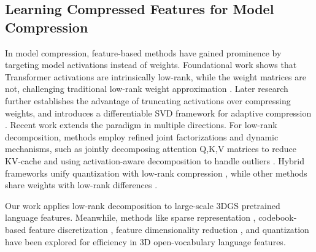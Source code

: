\documentclass[10pt,twocolumn,letterpaper]{article}
\begin{document}
\subsection{Learning Compressed Features for Model Compression}
In model compression, feature-based methods have gained prominence by targeting model activations instead of weights. Foundational work shows that Transformer activations are intrinsically low-rank, while the weight matrices are not, challenging traditional low-rank weight approximation \cite{yu2023compressing}. Later research further establishes the advantage of truncating activations over compressing weights, and introduces a differentiable SVD framework for adaptive compression \cite{wang2025dobi}.
Recent work extends the paradigm in multiple directions. For low-rank decomposition, methods employ refined joint factorizations and dynamic mechanisms, such as jointly decomposing attention Q,K,V matrices to reduce KV-cache \cite{wang2025qsvd} and using activation-aware decomposition to handle outliers \cite{lu2025nsvd}. Hybrid frameworks unify quantization with low-rank compression \cite{chiang2025uniql}, while other methods share weights with low-rank differences \cite{mikaelyan2025deltallm}.

Our work applies low-rank decomposition to large-scale 3DGS pretrained language features. Meanwhile, methods like sparse representation \cite{li2025langsplatv2}, codebook-based feature discretization \cite{wu2024opengaussian}, feature dimensionality reduction \cite{qin2024langsplat}, and quantization \cite{drsplat25} have been explored for efficiency in 3D open-vocabulary language features.
\end{document}
